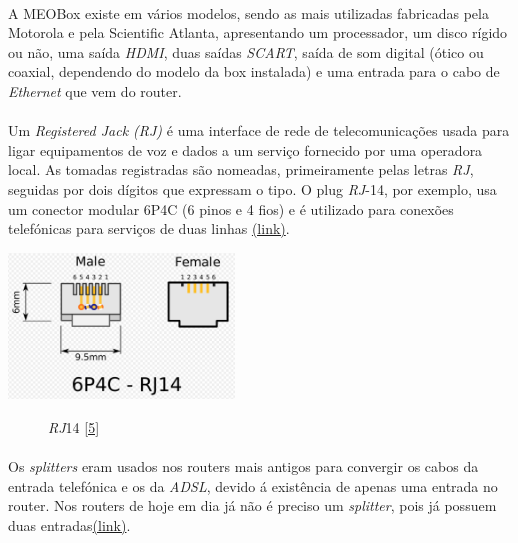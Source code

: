 \documentclass{report}
\begin{document}
\paragraph{}A MEOBox existe em vários modelos, sendo as mais utilizadas fabricadas pela Motorola e pela Scientific Atlanta, apresentando um processador, um disco rígido ou não, uma saída \textit{HDMI}, duas saídas \textit{SCART}, saída de som digital (ótico ou coaxial, dependendo do modelo da box instalada) e uma entrada para o cabo de \textit{Ethernet} que vem do router.

\paragraph{}Um \textit{Registered Jack (RJ)} é uma interface de rede de telecomunicações usada para ligar equipamentos de voz e dados a um serviço fornecido por uma operadora local. As tomadas registradas são nomeadas, primeiramente pelas letras \textit{RJ}, seguidas por dois dígitos que expressam o tipo. O plug \textit{RJ}-14, por exemplo, usa um conector modular 6P4C (6 pinos e 4 fios) e é utilizado para conexões telefónicas para serviços de duas linhas \href{https://pt.wikipedia.org/wiki/RJ_(conector)}{(link)}.

\begin{center}
\includegraphics[width=6cm]{RJ14.pdf} 
\begin{figure}[h]
\caption{\textit{RJ}14 \href{https://upload.wikimedia.org/wikipedia/commons/c/c6/RJ14.svg}{[5]}}
\end{figure}
\end{center}

\newpage

\paragraph{}Os \textit{splitters} eram usados nos routers mais antigos para convergir os cabos da entrada telefónica e os da \textit{ADSL}, devido á existência de apenas uma entrada no router. Nos routers de hoje em dia já não é preciso um \textit{splitter}, pois já possuem duas entradas\href{https://www.ispblog.com.br/2016/10/31/splitter-entenda-o-que-e-e-os-seus-modelos/}{(link)}.
\end{document}
